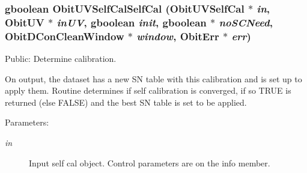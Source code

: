 \subsubsection{\setlength{\rightskip}{0pt plus 5cm}gboolean Obit\-UVSelf\-Cal\-Self\-Cal ({\bf Obit\-UVSelf\-Cal} $\ast$ {\em in}, {\bf Obit\-UV} $\ast$ {\em in\-UV}, gboolean {\em init}, gboolean $\ast$ {\em no\-SCNeed}, {\bf Obit\-DCon\-Clean\-Window} $\ast$ {\em window}, {\bf Obit\-Err} $\ast$ {\em err})}\label{ObitUVSelfCal_8c_a11}


Public: Determine calibration. 

On output, the dataset has a new SN table with this calibration and is set up to apply them. Routine determines if self calibration is converged, if so TRUE is returned (else FALSE) and the best SN table is set to be applied. \begin{Desc}
\item[Parameters:]
\begin{description}
\item[{\em in}]Input self cal object. Control parameters are on the info member. \begin{itemize}

\end{itemize}
\end{description}
\end{Desc}
